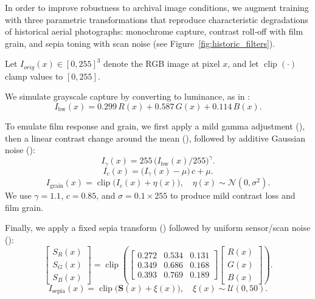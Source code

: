 In order to improve robustness to archival image conditions, we augment training with three parametric transformations that reproduce characteristic degradations of historical aerial photographs: monochrome capture, contrast roll‑off with film grain, and sepia toning with scan noise (see Figure~\ref{fig:historic_filters}). 

Let $I_{orig}(x)\in[0,255]^3$ denote the RGB image at pixel $x$, and let $\operatorname{clip}(\cdot)$ clamp values to $[0,255]$.

We simulate grayscale capture by converting to luminance, as in :
\begin{equation}
I_{\text{bw}}(x) = 0.299\,R(x) + 0.587\,G(x) + 0.114\,B(x).
\label{eq:gray}
\end{equation}

To emulate film response and grain, we first apply a mild gamma adjustment (), then a linear contrast change around the mean (), followed by additive Gaussian noise ():
\begin{equation}
I_{\gamma}(x) = 255\,\big(I_{\text{bw}}(x)/255\big)^{\gamma}.
\label{eq:gamma}
\end{equation}
\begin{equation}
I_{c}(x) = \big(I_{\gamma}(x) - \mu\big)\,c + \mu.
\label{eq:contrast}
\end{equation}
\begin{equation}
I_{\text{grain}}(x) = \operatorname{clip}\big(I_{c}(x) + \eta(x)\big),\quad \eta(x)\sim\mathcal{N}(0,\sigma^2).
\label{eq:grain}
\end{equation}
We use $\gamma=1.1$, $c=0.85$, and $\sigma=0.1\times 255$ to produce mild contrast loss and film grain.

Finally, we apply a fixed sepia transform () followed by uniform sensor/scan noise ():
\begin{equation}
\begin{bmatrix} S_R(x) \\ S_G(x) \\ S_B(x) \end{bmatrix}
= \operatorname{clip}\left(
\begin{bmatrix}
0.272 & 0.534 & 0.131 \\
0.349 & 0.686 & 0.168 \\
0.393 & 0.769 & 0.189
\end{bmatrix}
\begin{bmatrix} R(x) \\ G(x) \\ B(x) \end{bmatrix}
\right).
\label{eq:sepia}
\end{equation}
\begin{equation}
I_{\text{sepia}}(x) = \operatorname{clip}\big(\mathbf{S}(x) + \xi(x)\big),\quad \xi(x)\sim\mathcal{U}(0,50).
\label{eq:sepia_noise}
\end{equation}

